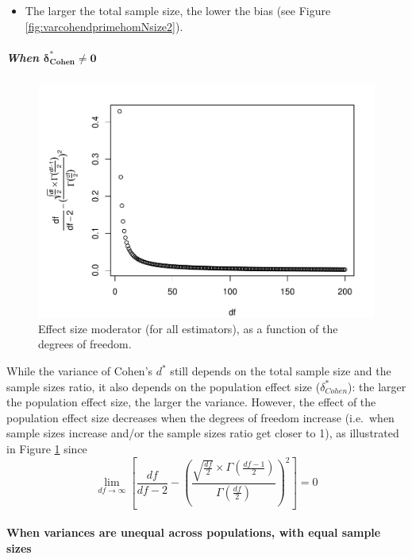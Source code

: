 \documentclass[
  english,
  man,mask]{apa6}
\providecommand{\tightlist}{%
  \setlength{\itemsep}{0pt}\setlength{\parskip}{0pt}}
\let\oldparagraph\paragraph
\renewcommand{\paragraph}[1]{\oldparagraph{#1}\mbox{}}
\let\oldsubparagraph\subparagraph
\renewcommand{\subparagraph}[1]{\oldsubparagraph{#1}\mbox{}}
\begin{document}
\begin{itemize}
\tightlist
\item
  The larger the total sample size, the lower the bias (see Figure \ref{fig:varcohendprimehomNsize2}).
\end{itemize}

\hypertarget{when-bmdelta_cohen-neq-0}{%
\subparagraph{\texorpdfstring{When \(\bm{\delta^*_{Cohen} \neq 0}\)}{When \textbackslash bm\{\textbackslash delta\^{}*\_\{Cohen\} \textbackslash neq 0\}}}\label{when-bmdelta_cohen-neq-0}}

\begin{figure}
\centering
\includegraphics{SupMat1_files/figure-latex/ESmoderator2-1.pdf}
\caption{\label{fig:ESmoderator2}Effect size moderator (for all estimators), as a function of the degrees of freedom.}
\end{figure}

While the variance of Cohen's \(d^*\) still depends on the total sample size and the sample sizes ratio, it also depends on the population effect size (\(\delta^*_{Cohen}\)): the larger the population effect size, the larger the variance. However, the effect of the population effect size decreases when the degrees of freedom increase (i.e.~when sample sizes increase and/or the sample sizes ratio get closer to 1), as illustrated in Figure \ref{fig:ESmoderator2} since
\[\lim_{df\rightarrow \infty}\left[\frac{df}{df-2} - \left( \frac{\sqrt{\frac{df}{2}} \times \Gamma \left(\frac{df-1}{2} \right)}{\Gamma \left( \frac{df}{2}\right)}\right)^2 \right]=0\]

\hypertarget{when-variances-are-unequal-across-populations-with-equal-sample-sizes-3}{%
\paragraph{When variances are unequal across populations, with equal sample sizes}\label{when-variances-are-unequal-across-populations-with-equal-sample-sizes-3}}
\end{document}

